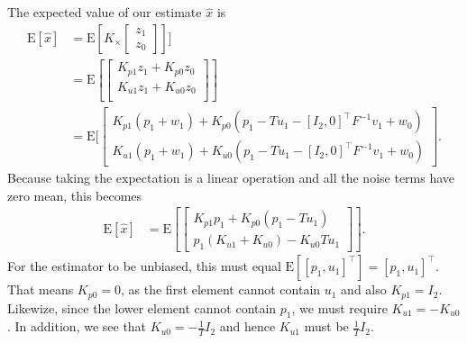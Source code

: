 \documentclass[]{article}
\begin{document}
\subsection{}
The expected value of our estimate $\hat x$ is
\begin{equation}\begin{aligned}
\text{E}[\hat x]
&= \text{E}[K_\times \begin{bmatrix}z_1 \\ z_0 \end{bmatrix}]] \\
&= \text{E}[
\begin{bmatrix}
K_{p1}z_1 + K_{p0}z_0 \\
K_{u1}z_1 + K_{u0}z_0 \\
\end{bmatrix} ] \\
&= \text{E}[
\begin{bmatrix}
K_{p1}(p_1 + w_1) + K_{p0} (p_1 - Tu_1 - [I_2, 0]^\top F^{-1}v_1 + w_0) \\
K_{u1}(p_1 + w_1) + K_{u0} (p_1 - Tu_1 - [I_2, 0]^\top F^{-1}v_1 + w_0)
\end{bmatrix}.
\end{aligned}\end{equation}
Because taking the expectation is a linear operation and all the noise terms have zero mean, this becomes
\begin{equation}\begin{aligned}
\text{E}[\hat x]
&= \text{E}[
\begin{bmatrix}
K_{p1}p_1 + K_{p0} (p_1 - Tu_1) \\
p_1(K_{u1} + K_{u0}) -K_{u0}Tu_1
\end{bmatrix}].
\end{aligned}\end{equation}
For the estimator to be unbiased, this must equal $\text{E}[[p_1, u_1]^\top] = [p_1, u_1]^\top$. That means $K_{p0} = 0$, as the first element cannot contain $u_1$ and also $K_{p1} = I_2$. Likewize, since the lower element cannot contain $p_1$, we must require $K_{u1} = - K_{u0}$. In addition, we see that $K_{u0} = -\frac{1}{T} I_2$ and hence $K_{u1}$ must be $\frac{1}{T}I_2$.
\end{document}

